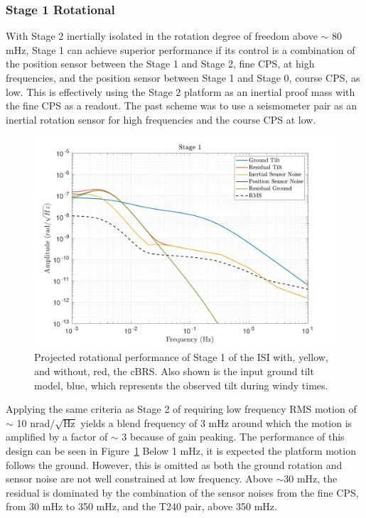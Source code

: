 \documentclass [12pt, proquest]{uwthesis}[2019]
\begin{document}
\subsubsection{Stage 1 Rotational}

With Stage 2 inertially isolated in the rotation degree of freedom above $\sim$ 80 mHz, Stage 1 can achieve superior performance if its control is a combination of the position sensor between the Stage 1 and Stage 2, fine CPS, at high frequencies, and the position sensor between Stage 1 and Stage 0, course CPS, as low. This is effectively using the Stage 2 platform as an inertial proof mass with the fine CPS as a readout. The past scheme was to use a seismometer pair as an inertial rotation sensor for high frequencies and the course CPS at low. 

\begin{figure}[!h]
\begin{center}
\includegraphics[width=\textwidth]{cBRS_Model_ST1RX.pdf}
\caption[Projected rotational performance of Stage 1 of the ISI]{Projected rotational performance of Stage 1 of the ISI with, yellow, and without, red, the cBRS. Also shown is the input ground tilt model, blue, which represents the observed tilt during windy times.}
\label{cBRS1R}
\end{center}
\end{figure}

Applying the same criteria as Stage 2 of requiring low frequency RMS motion of $\sim$ 10 nrad$/\sqrt{\text{Hz}}$ yields a blend frequency of 3 mHz around which the motion is amplified by a factor of $\sim$ 3 because of gain peaking. The performance of this design can be seen in Figure~\ref{cBRS1R} Below 1 mHz, it is expected the platform motion follows the ground. However, this is omitted as both the ground rotation and sensor noise are not well constrained at low frequency. Above $\sim$30 mHz, the residual is dominated by the combination of the sensor noises from the fine CPS, from 30 mHz to 350 mHz, and the T240 pair, above 350 mHz.
\end{document}
